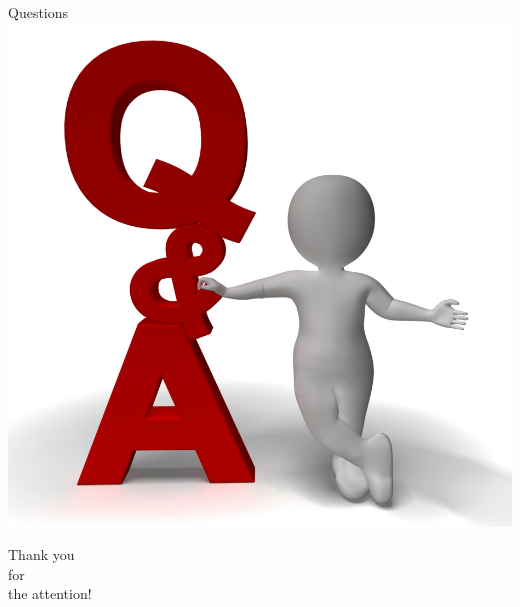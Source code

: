 \documentclass[12pt]{beamer}
\begin{document}
	\begin{frame}
	\begin{center}
	{\Huge Questions}\\
	\includegraphics[scale=0.25]{questions.png}
	\end{center}
	\end{frame}
	
	\begin{frame}
	\begin{center}
	{\Huge Thank you\\for\\the attention!}
	\end{center}
	\end{frame}
\end{document}
